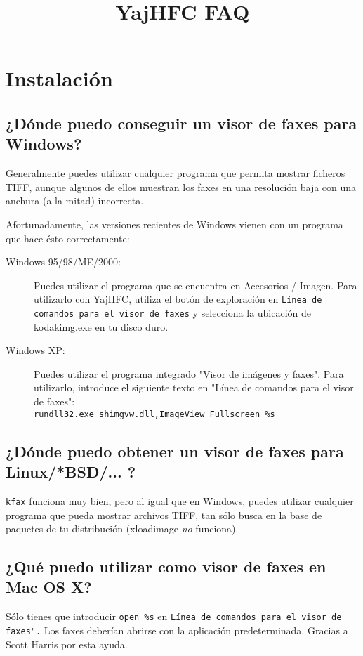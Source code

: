 \documentclass[a4paper,10pt]{scrartcl}
\title{YajHFC FAQ}
\author{}
\date{}
\begin{document}
\maketitle

\tableofcontents

\section{Instalación}
\subsection{¿Dónde puedo conseguir un visor de faxes para Windows?}

Generalmente puedes utilizar cualquier programa que permita mostrar ficheros TIFF, aunque algunos de ellos muestran los faxes en una resolución baja con una anchura (a la mitad) incorrecta.

Afortunadamente, las versiones recientes de Windows vienen con un programa 
que hace ésto correctamente:

\begin{description}
\item[Windows 95/98/ME/2000:]
Puedes utilizar el programa que se encuentra en Accesorios / Imagen. 
Para utilizarlo con YajHFC, utiliza el botón de exploración en \texttt{Línea de comandos 
para el visor de faxes} y selecciona la ubicación de kodakimg.exe en tu disco duro.

\item[Windows XP:]
Puedes utilizar el programa integrado "Visor de imágenes y faxes". 
Para utilizarlo, introduce el siguiente texto en "Línea de comandos para el visor de faxes":\\
      \verb#rundll32.exe shimgvw.dll,ImageView_Fullscreen %s#
 \end{description}

      
\subsection{¿Dónde puedo obtener un visor de faxes para Linux/*BSD/... ?}
\texttt{kfax} funciona muy bien, pero al igual que en Windows, puedes utilizar cualquier programa que pueda mostrar archivos TIFF, tan sólo busca en la base de paquetes de tu distribución (xloadimage \emph{no} funciona).


\subsection{¿Qué puedo utilizar como visor de faxes en Mac OS X?}
Sólo tienes que introducir \verb#open %s# en \texttt{Línea de comandos para el visor de faxes".}
Los faxes deberían abrirse con la aplicación predeterminada. 
Gracias a Scott Harris por esta ayuda.
\end{document}
